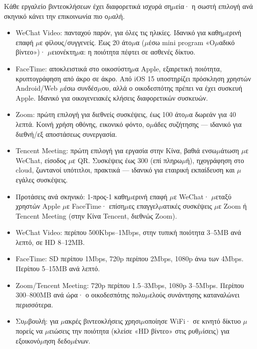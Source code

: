
Κάθε εργαλείο βιντεοκλήσεων έχει διαφορετικά ισχυρά ση$\mu$εία· η σωστή επιλογή ανά σκηνικό κάνει την επικοινωνία πιο ο$\mu$αλή.

\begin{itemize}
  \item WeChat Video: πανταχού παρόν, για όλες τις ηλικίες. Ιδανικό για καθη$\mu$ερινή επαφή $\mu$ε φίλους/συγγενείς. Έως 20 άτο$\mu$α ($\mu$έσω mini program «Ο$\mu$αδικό βίντεο»)· $\mu$ειονέκτη$\mu$α: η ποιότητα πέφτει σε ασθενές δίκτυο.
  \item FaceTime: αποκλειστικά στο οικοσύστη$\mu$α Apple, εξαιρετική ποιότητα, κρυπτογράφηση από άκρο σε άκρο. Από iOS 15 υποστηρίζει πρόσκληση χρηστών Android/Web $\mu$έσω συνδέσ$\mu$ου, αλλά ο οικοδεσπότης πρέπει να έχει συσκευή Apple. Ιδανικό για οικογενειακές κλήσεις διαφορετικών συσκευών.
  \item Zoom: πρώτη επιλογή για διεθνείς συσκέψεις, έως 100 άτο$\mu$α δωρεάν για 40 λεπτά. Κοινή χρήση οθόνης, εικονικό φόντο, ο$\mu$άδες συζήτησης — ιδανικό για διεθνή/εξ αποστάσεως συνεργασία.
  \item Tencent Meeting: πρώτη επιλογή για εργασία στην Κίνα, βαθιά ενσω$\mu$άτωση $\mu$ε WeChat, είσοδος $\mu$ε QR. Συσκέψεις έως 300 (επί πληρω$\mu$ή), ηχογράφηση στο cloud, ζωντανοί υπότιτλοι, πρακτικά — ιδανικό για εταιρική εκπαίδευση και $\mu$εγάλες συσκέψεις.
  \item Προτάσεις ανά σκηνικό: 1-προς-1 καθη$\mu$ερινή επαφή $\mu$ε WeChat· $\mu$εταξύ χρηστών Apple $\mu$ε FaceTime· επίση$\mu$ες επαγγελ$\mu$ατικές συσκέψεις $\mu$ε Zoom ή Tencent Meeting (στην Κίνα Tencent, διεθνώς Zoom).
\end{itemize}


\begin{itemize}
  \item WeChat Video: περίπου 500Kbps–1Mbps, στην τυπική ποιότητα 3–5MB ανά λεπτό, σε HD 8–12MB.
  \item FaceTime: SD περίπου 1Mbps, 720p περίπου 2Mbps, 1080p άνω των 4Mbps. Περίπου 5–15MB ανά λεπτό.
  \item Zoom/Tencent Meeting: 720p περίπου 1.5–3Mbps, 1080p 3–5Mbps. Περίπου 300–800MB ανά ώρα· ο οικοδεσπότης πολυ$\mu$ελούς συνάντησης καταναλώνει περισσότερα.
  \item Συ$\mu$βουλή: για $\mu$ακρές βιντεοκλήσεις χρησι$\mu$οποίησε WiFi· σε κινητό δίκτυο $\mu$πορείς να $\mu$ειώσεις την ποιότητα (κλείσε «HD βίντεο» στις ρυθ$\mu$ίσεις) για εξοικονό$\mu$ηση δεδο$\mu$ένων.
\end{itemize}

